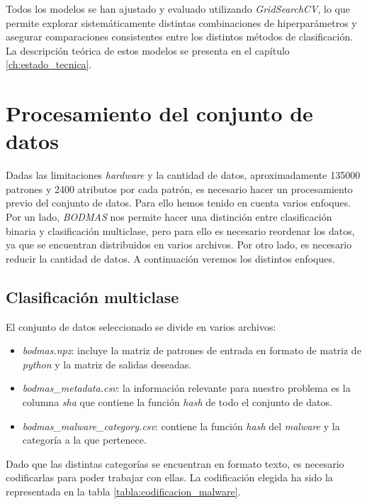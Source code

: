 Todos los modelos se han ajustado y evaluado utilizando \textit{GridSearchCV}, lo que permite explorar sistemáticamente distintas combinaciones de hiperparámetros y asegurar comparaciones consistentes entre los distintos métodos de clasificación. La descripción teórica de estos modelos se presenta en el capítulo \ref{ch:estado_tecnica}.


\section{Procesamiento del conjunto de datos}
\label{sec:proc_dataset}

Dadas las limitaciones \textit{hardware} y la cantidad de datos, aproximadamente 135000 patrones y 2400 atributos por cada patrón, es necesario hacer un procesamiento previo del conjunto de datos. Para ello hemos tenido en cuenta varios enfoques. Por un lado, \textit{BODMAS} nos permite hacer una distinción entre clasificación binaria y clasificación multiclase, pero para ello es necesario reordenar los datos, ya que se encuentran distribuidos en varios archivos. Por otro lado, es necesario reducir la cantidad de datos. A continuación veremos los distintos enfoques.

\subsection{Clasificación multiclase}
\label{subsec:multiclass}

El conjunto de datos seleccionado se divide en varios archivos:

\begin{itemize}
	\item \textit{bodmas.npz}: incluye la matriz de patrones de entrada en formato de matriz de \textit{python} y la matriz de salidas deseadas.
	\item \textit{bodmas\_metadata.csv}: la información relevante para nuestro problema es la columna \textit{sha} que contiene la función \textit{hash} de todo el conjunto de datos.
	\item \textit{bodmas\_malware\_category.csv}: contiene la función \textit{hash} del \textit{malware} y la categoría a la que pertenece.
\end{itemize}

Dado que las distintas categorías se encuentran en formato texto, es necesario codificarlas para poder trabajar con ellas. La codificación elegida ha sido la representada en la tabla \ref{tabla:codificacion_malware}.

